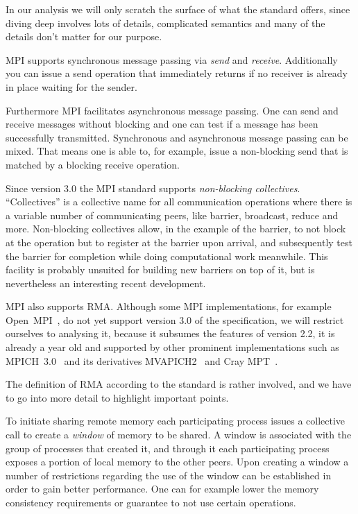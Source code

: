 \documentclass[a4paper, 10pt]{article}
\begin{document}
In our analysis we will only scratch the surface of what the standard offers, since diving deep involves lots of details, complicated semantics and many of the details don't matter for our purpose.

MPI supports synchronous message passing via \emph{send} and \emph{receive}. Additionally you can issue a send operation that immediately returns if no receiver is already in place waiting for the sender.

Furthermore MPI facilitates asynchronous message passing. One can send and receive messages without blocking and one can test if a message has been successfully transmitted. Synchronous and asynchronous message passing can be mixed. That means one is able to, for example, issue a non-blocking send that is matched by a blocking receive operation.

Since version 3.0 the MPI standard supports \emph{non-blocking collectives}. ``Collectives'' is a collective name for all communication operations where there is a variable number of communicating  peers, like barrier, broadcast, reduce and more.
Non-blocking collectives allow, in the example of the barrier, to not block at the operation but to register at the barrier upon arrival, and subsequently test the barrier for completion while doing computational work meanwhile.
This facility is probably unsuited for building new barriers on top of it, but is nevertheless an interesting recent development.

MPI also supports RMA. Although some MPI implementations, for example Open~MPI~\cite{openmpi}, do not yet support version 3.0 of the specification, we will restrict ourselves to analysing it, because it subsumes the features of version 2.2, it is already a year old and supported by other prominent implementations such as MPICH~3.0~\cite{mpich} and its derivatives MVAPICH2~\cite{mvapich} and Cray MPT~\cite{craympt}.

The definition of RMA according to the standard is rather involved, and we have to go into more detail to highlight important points.

To initiate sharing remote memory each participating process issues a collective call to create a \emph{window} of memory to be shared. A window is associated with the group of processes that created it, and through it each participating process exposes a portion of local memory to the other peers.
Upon creating a window a number of restrictions regarding the use of the window can be established in order to gain better performance. One can for example lower the memory consistency requirements or guarantee to not use certain operations.
\end{document}
